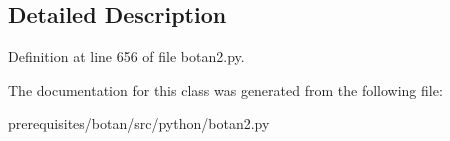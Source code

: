 \subsection{Detailed Description}


Definition at line 656 of file botan2.\+py.



The documentation for this class was generated from the following file\+:\begin{DoxyCompactItemize}
\item 
prerequisites/botan/src/python/botan2.\+py\end{DoxyCompactItemize}
